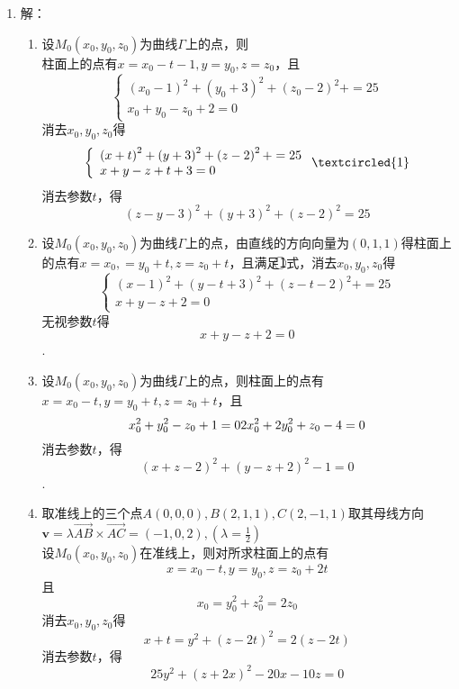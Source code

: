 \documentclass[UTF8]{ctexart}
\begin{document}
\begin{enumerate}
\item 解：\begin{enumerate}[(1)]
\item 设$M_0\left(x_0,y_0,z_0\right)$为曲线$\Gamma$上的点，则\\
柱面上的点有$x=x_0-t-1,y=y_0,z=z_0$，且$$\left\{\begin{array}{l}\left(x_0-1\right)^2+\left(y_0+3\right)^2+\left(z_0-2\right)^2+=25\\x_0+y_0-z_0+2=0\end{array}\right.$$消去$x_0,y_0,z_0$得$$\left\{\begin{array}{l}\left(x+t\right)^2+\left(y+3\right)^2+\left(z-2\right)^2+=25\\x+y-z+t+3=0\end{array}\right.\textcircled{1}$$消去参数$t$，得$$\left(z-y-3\right)^2+\left(y+3\right)^2+\left(z-2\right)^2=25$$
\item 设$M_0\left(x_0,y_0,z_0\right)$为曲线$\Gamma$上的点，由直线的方向向量为$\left(0,1,1\right)$得柱面上的点有$x=x_0,=y_0+t,z=z_0+t$，且满足\textcircled{1}式，消去$x_0,y_0,z_0$得$$\left\{\begin{array}{l}\left(x-1\right)^2+\left(y-t+3\right)^2+\left(z-t-2\right)^2+=25\\x+y-z+2=0\end{array}\right.$$无视参数$t$得$$x+y-z+2=0$$.
\item 设$M_0\left(x_0,y_0,z_0\right)$为曲线$\Gamma$上的点，则柱面上的点有$x=x_0-t,y=y_0+t,z=z_0+t$，且$$x_0^2+y_0^2-z_0+1=0\\2x_0^2+2y_0^2+z_0-4=0$$消去参数$t$，得$$\left(x+z-2\right)^2+\left(y-z+2\right)^2-1=0$$.
\item 取准线上的三个点$A\left(0,0,0\right),B\left(2,1,1\right),C\left(2,-1,1\right)$取其母线方向$\mathbf{v}=\lambda\overrightarrow{AB}\times\overrightarrow{AC}=\left(-1,0,2\right),\left(\lambda=\displaystyle\frac{1}{2}\right)$\\
设$M_0\left(x_0,y_0,z_0\right)$在准线上，则对所求柱面上的点有$$x=x_0-t,y=y_0,z=z_0+2t$$且$$x_0=y_0^2+z_0^2=2z_0$$消去$x_0,y_0,z_0$得$$x+t=y^2+\left(z-2t\right)^2=2\left(z-2t\right)$$消去参数$t$，得$$25y^2+\left(z+2x\right)^2-20x-10z=0$$
\end{enumerate}


\end{enumerate}
\end{document}
